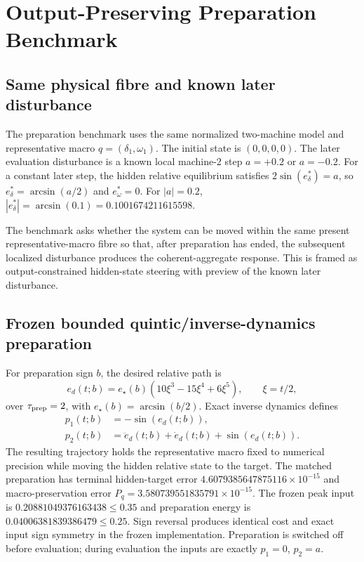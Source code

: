 \section{Output-Preserving Preparation Benchmark}

\subsection{Same physical fibre and known later disturbance}

The preparation benchmark uses the same normalized two-machine model and representative macro $q=(\delta_1,\omega_1)$. The initial state is $(0,0,0,0)$. The later evaluation disturbance is a known local machine-2 step $a=+0.2$ or $a=-0.2$. For a constant later step, the hidden relative equilibrium satisfies $2\sin(e_\delta^*)=a$, so $e_\delta^*=\arcsin(a/2)$ and $e_\omega^*=0$. For $|a|=0.2$, $|e_\delta^*|=\arcsin(0.1)=0.1001674211615598$.

The benchmark asks whether the system can be moved within the same present representative-macro fibre so that, after preparation has ended, the subsequent localized disturbance produces the coherent-aggregate response. This is framed as output-constrained hidden-state steering with preview of the known later disturbance.\cite{Isidori2013,NtogramatzidisPadula2017,Goodwin2011,VermaNiazi2013,LiBose1995}

\subsection{Frozen bounded quintic/inverse-dynamics preparation}

For preparation sign $b$, the desired relative path is
\begin{equation}
e_d(t;b)=e_\star(b)\left(10\xi^3-15\xi^4+6\xi^5\right),\qquad \xi=t/2,
\end{equation}
over $\tau_{\rm prep}=2$, with $e_\star(b)=\arcsin(b/2)$. Exact inverse dynamics defines
\begin{align}
p_1(t;b)&=-\sin(e_d(t;b)),\\
p_2(t;b)&=\ddot e_d(t;b)+\dot e_d(t;b)+\sin(e_d(t;b)).
\end{align}
The resulting trajectory holds the representative macro fixed to numerical precision while moving the hidden relative state to the target. The matched preparation has terminal hidden-target error $4.6079385647875116\times10^{-15}$ and macro-preservation error $P_q=3.580739551835791\times10^{-15}$. The frozen peak input is $0.20881049376163438\le0.35$ and preparation energy is $0.04006381839386479\le0.25$. Sign reversal produces identical cost and exact input sign symmetry in the frozen implementation. Preparation is switched off before evaluation; during evaluation the inputs are exactly $p_1=0$, $p_2=a$.

